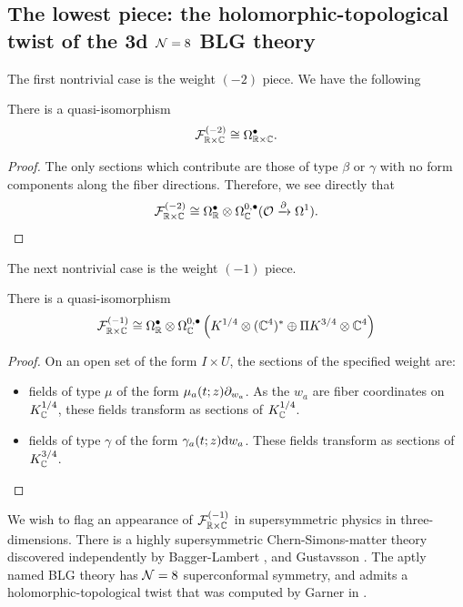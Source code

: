 \subsection{The lowest piece: the holomorphic-topological twist of the 3d $\mathcal{N}=8$ BLG theory}\label{sec:BLG}
\parsec[] The first nontrivial case is the weight ${(-2)}$ piece. We have the following

\begin{lem}
There is a quasi-isomorphism \[\mathcal{F}^{(-2)}_{\mathbb{R}\times \mathbb{C}} \cong \Omega^\bullet_{\mathbb{R}\times \mathbb{C}}.\]
\end{lem}
\begin{proof}
The only sections which contribute are those of type $\beta$ or $\gamma$ with no form components along the fiber directions. Therefore, we see directly that \[\mathcal{F}^{(-2)}_{\mathbb{R}\times \mathbb{C}} \cong \Omega^\bullet _{\mathbb{R}} \otimes \Omega^{0,\bullet}_{\mathbb{C}} ( \mathcal{O} \xrightarrow{\partial} \Omega^1 ).\] 
\end{proof}

\parsec[] The next nontrivial case is the weight ${(-1)}$ piece. 

\begin{lem}
There is a quasi-isomorphism \[ \mathcal{F}^{(-1)}_{\mathbb{R}\times \mathbb{C}} \cong \Omega^\bullet _{\mathbb{R}} \otimes \Omega^{0,\bullet}_{\mathbb{C}} \left (K^{1/4}\otimes (\mathbb{C}^4)^* \oplus \Pi K^{3/4}\otimes \mathbb{C}^4 \right ) \]
\end{lem}
\begin{proof}
On an open set of the form $I\times U$, the sections of the specified weight are:
\begin{itemize}
\item fields of type $\mu$ of the form $\mu_a(t; z) \partial_{w_a}$. As the $w_a$ are fiber coordinates on $K^{1/4}_{\mathbb{C}}$, these fields transform as sections of $K^{1/4}_{\mathbb{C}}$.
\item fields of type $\gamma$ of the form $\gamma_a(t;z) \mathrm{d} w_a$. These fields transform as sections of $K^{3/4}_{\mathbb{C}}$. 
\end{itemize}
\end{proof}

\parsec[]
We wish to flag an appearance of $\mathcal{F}^{(-1)}_{\mathbb{R}\times \mathbb{C}}$ in supersymmetric physics in three-dimensions. There is a highly supersymmetric Chern-Simons-matter theory discovered independently by Bagger-Lambert \cite{Bagger_2007}, \cite{Bagger:2007jr} and Gustavsson \cite{Gustavsson:2007vu}. The aptly named BLG theory has $\mathcal{N}=8$ superconformal symmetry, and admits a holomorphic-topological twist that was computed by Garner in \cite{Garner2022vds}. 

